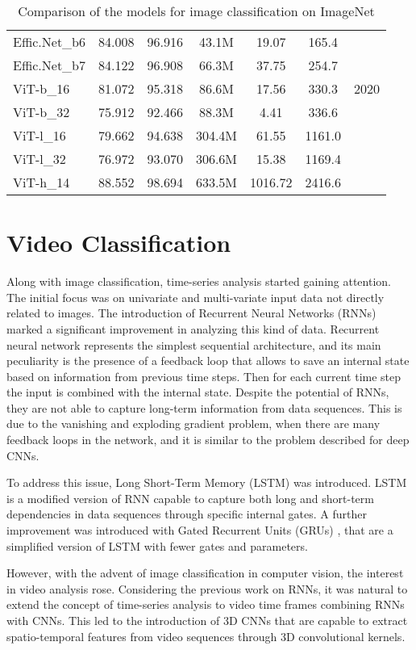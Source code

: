 \begin{table}[h]
\begin{tabular}{l|c|c|c|c|c|c}
        Effic.Net\_b6 & 84.008 & 96.916 & 43.1M & 19.07 & 165.4 & \\
        Effic.Net\_b7 & 84.122 & 96.908 & 66.3M & 37.75 & 254.7 & \\
        \hline
        ViT-b\_16 & 81.072 & 95.318 & 86.6M & 17.56 & 330.3 & 2020 \\
        ViT-b\_32 & 75.912 & 92.466 & 88.3M & 4.41 & 336.6 & \\
        ViT-l\_16 & 79.662 & 94.638 & 304.4M & 61.55 & 1161.0 & \\
        ViT-l\_32 & 76.972 & 93.070 & 306.6M & 15.38 & 1169.4 & \\
        ViT-h\_14 & 88.552 & 98.694 & 633.5M & 1016.72 & 2416.6 & \\
        \hline
    \end{tabular}
    \caption{Comparison of the models for image classification on ImageNet}
    \label{tab:cnn_comparison}
\end{table}


\section{Video Classification}
Along with image classification, time-series analysis started gaining attention. 
The initial focus was on univariate and multi-variate input 
data not directly related to images. 
The introduction of Recurrent Neural Networks (RNNs) \cite{rnn} marked a 
significant improvement in analyzing this kind of data. Recurrent neural 
network represents the simplest sequential architecture, and its main 
peculiarity is the presence of a feedback loop that allows to save an internal 
state based on information from previous time steps. Then for each current time 
step the input is combined with the internal state.
Despite the potential of RNNs, they are not able to capture long-term 
information from data sequences. This is due to the vanishing and exploding 
gradient problem, when there are many feedback loops in the network, and it is 
similar to the problem described for deep CNNs.

To address this issue, Long Short-Term Memory (LSTM) \cite{lstm} was introduced. 
LSTM is a modified version of RNN capable to capture both long and short-term 
dependencies in data sequences through specific internal gates. 
A further improvement was introduced with Gated Recurrent Units (GRUs) 
\cite{gru}, that are a simplified version of LSTM with fewer gates and 
parameters.

However, with the advent of image classification in computer vision, 
the interest in video analysis rose. Considering the previous work on RNNs, 
it was natural to extend the concept of time-series analysis to video time 
frames combining RNNs with CNNs. This led to the introduction of 3D CNNs that 
are capable to extract spatio-temporal features from video sequences through 
3D convolutional kernels.

